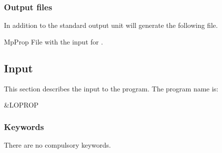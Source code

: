 \subsubsection{Output files}
In addition to the standard output unit  will generate the following
file.

\begin{filelist}
\item[MpProp]
File with the input for .
\end{filelist}

\subsection{Input}
\label{UG:sec:LoProp_input}

This section describes the input to the
 program. The program name is:
\begin{inputlisting}
 &LOPROP
\end{inputlisting}

\subsubsection{Keywords}
There are no compulsory keywords.

